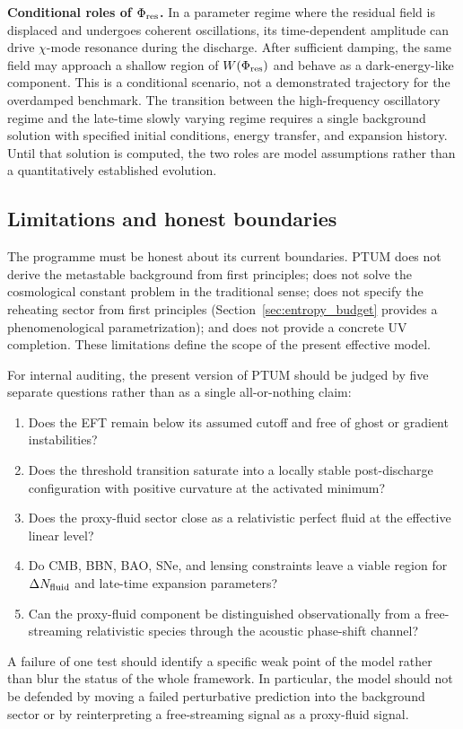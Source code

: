 \documentclass[epj]{svjour}
\begin{document}
\begin{description}
\noindent\textbf{Conditional roles of \(\Phi_{\rm res}\).}
In a parameter regime where the residual field is displaced and
undergoes coherent oscillations, its time-dependent amplitude can
drive \(\chi\)-mode resonance during the discharge. After sufficient
damping, the same field may approach a shallow region of
\(W(\Phi_{\rm res})\) and behave as a dark-energy-like component.
This is a conditional scenario, not a demonstrated trajectory for
the overdamped benchmark. The transition between the high-frequency
oscillatory regime and the late-time slowly varying regime requires
a single background solution with specified initial conditions,
energy transfer, and expansion history. Until that solution is
computed, the two roles are model assumptions rather than a
quantitatively established evolution.

\end{description}

\subsection{Limitations and honest boundaries}
\label{sec:limits}

The programme must be honest about its current boundaries. PTUM
does not derive the metastable background from first principles;
does not solve the cosmological constant problem in the traditional
sense; does not specify the reheating sector from first principles
(Section~\ref{sec:entropy_budget} provides a phenomenological
parametrization); and does not provide a concrete UV completion.
These limitations define the scope of the present effective model.

For internal auditing, the present version of PTUM should be judged by five
separate questions rather than as a single all-or-nothing claim:
\begin{enumerate}[label=(\roman*)]
\item Does the EFT remain below its assumed cutoff and free of ghost or gradient
instabilities?
\item Does the threshold transition saturate into a locally stable post-discharge
configuration with positive curvature at the activated minimum?
\item Does the proxy-fluid sector close as a relativistic perfect fluid at the
effective linear level?
\item Do CMB, BBN, BAO, SNe, and lensing constraints leave a viable region for
$\Delta N_{\rm fluid}$ and late-time expansion parameters?
\item Can the proxy-fluid component be distinguished observationally from a
free-streaming relativistic species through the acoustic phase-shift channel?
\end{enumerate}
A failure of one test should identify a specific weak point of the model rather
than blur the status of the whole framework.  In particular, the model should
not be defended by moving a failed perturbative prediction into the background
sector or by reinterpreting a free-streaming signal as a proxy-fluid signal.
\end{document}
